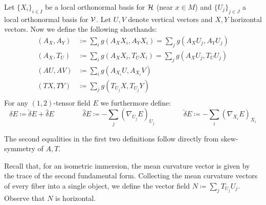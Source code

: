 \begin{mydef}
	Let $\{X_i\}_{i\in I}$ be a local orthonormal basis for $\mathcal{H}$ (near $x\in M$) and $\{U_j\}_{j\in J}$ a local orthonormal basis for $\mathcal{V}$. Let $U,V$ denote vertical vectors and $X,Y$ horizontal vectors. Now we define the following shorthands:
	\begin{align*}
		(A_X,A_Y)&\coloneqq \sum_i g(A_X X_i, A_Y X_i)=\sum_j g(A_X U_j,A_Y U_j)\\
		(A_X,T_U)&\coloneqq \sum_i g(A_X X_i, T_U X_i)=\sum_j g(A_X U_j,T_U U_j)\\
		(AU,AV)&\coloneqq \sum_i g(A_{X_i}U,A_{X_i}V)\\
		(TX,TY)&\coloneqq \sum_j g(T_{U_j}X,T_{U_j}Y)\\
	\end{align*}
	For any $(1,2)$-tensor field $E$ we furthermore define:
	\begin{equation*}
		\delta E\coloneqq \check\delta E+\hat\delta E \qquad \qquad 
		\hat \delta E\coloneqq -\sum_j(\nabla_{U_j}E)_{U_j}\qquad \qquad 
		\check \delta E\coloneqq -\sum_i (\nabla_{X_i} E)_{X_i}
	\end{equation*}
\end{mydef}

\begin{rem}
	The second equalities in the first two definitions follow directly from skew-symmetry of $A,T$.
\end{rem}

\begin{mydef}
	Recall that, for an isometric immersion, the mean curvature vector is given by the trace of the second fundamental form. Collecting the mean curvature vectors of every fiber into a single object, we define the vector field $N\coloneqq \sum_j T_{U_j}U_j$. Observe that $N$ is horizontal.
\end{mydef}

